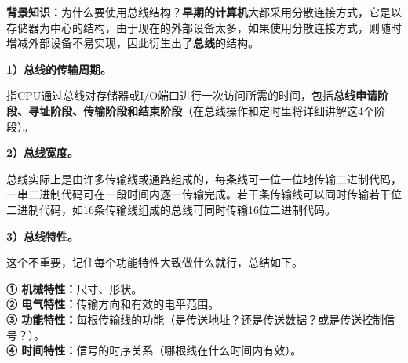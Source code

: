 {\textbf{背景知识：}}为什么要使用总线结构？\textbf{早期的计算机}大都采用分散连接方式，它是以存储器为中心的结构，由于现在的外部设备太多，如果使用分散连接方式，则随时增减外部设备不易实现，因此衍生出了\textbf{总线}的结构。

\textbf{1）总线的传输周期。}

指CPU通过总线对存储器或I/O端口进行一次访问所需的时间，包括\textbf{总线申请阶段、寻址阶段、传输阶段和结束阶段}（在总线操作和定时里将详细讲解这4个阶段）。

\textbf{2）总线宽度。}

总线实际上是由许多传输线或通路组成的，每条线可一位一位地传输二进制代码，一串二进制代码可在一段时间内逐一传输完成。若干条传输线可以同时传输若干位二进制代码，如16条传输线组成的总线可同时传输16位二进制代码。

\textbf{3）总线特性。}

这个不重要，记住每个功能特性大致做什么就行，总结如下。

\textbf{① 机械特性：}尺寸、形状。\\
\textbf{② 电气特性：}传输方向和有效的电平范围。\\
\textbf{③
功能特性：}每根传输线的功能（是传送地址？还是传送数据？或是传送控制信号？）。\\
\textbf{④ 时间特性：}信号的时序关系（哪根线在什么时间内有效）。
